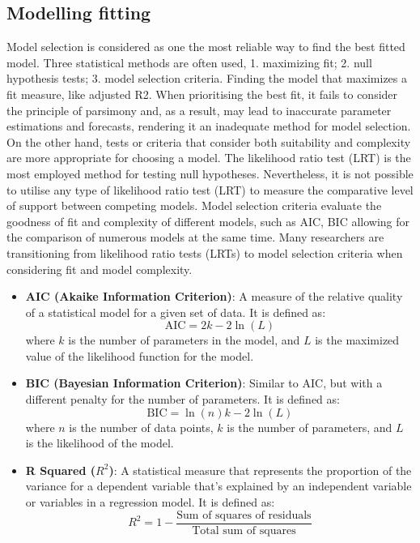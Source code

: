 \documentclass{article}
\begin{document}
\subsection{Modelling fitting}
Model selection is considered as one the most reliable way to find the best fitted model. 
Three statistical methods are often used, 1. maximizing fit; 2. null hypothesis tests; 3. model selection criteria\cite{johnson2004}.  Finding the model that maximizes a fit measure, like adjusted R2. 
When prioritising the best fit, it fails to consider the principle of parsimony and, as a result, may lead to inaccurate parameter estimations and forecasts, rendering it an inadequate method for model selection. On the other hand, tests or criteria that consider both suitability and complexity are more appropriate for choosing a model.
The likelihood ratio test (LRT) is the most employed method for testing null hypotheses. Nevertheless, it is not possible to utilise any type of likelihood ratio test (LRT) to measure the comparative level of support between competing models.
Model selection criteria evaluate the goodness of fit and complexity of different models, such as AIC, BIC allowing for the comparison of numerous models at the same time. 
Many researchers are transitioning from likelihood ratio tests (LRTs) to model selection criteria when considering fit and model complexity\cite{posada2003}. 
\begin{itemize}
    \item \textbf{AIC (Akaike Information Criterion)}: 
    A measure of the relative quality of a statistical model for a given set of data. It is defined as:
    \begin{equation}
        \text{AIC} = 2k - 2\ln(L)
    \end{equation}
    where $k$ is the number of parameters in the model, and $L$ is the maximized value of the likelihood function for the model.
    
    \item \textbf{BIC (Bayesian Information Criterion)}: 
    Similar to AIC, but with a different penalty for the number of parameters. It is defined as:
    \begin{equation}
        \text{BIC} = \ln(n)k - 2\ln(L)
    \end{equation}
    where $n$ is the number of data points, $k$ is the number of parameters, and $L$ is the likelihood of the model.
    
    \item \textbf{R Squared ($R^2$)}: 
    A statistical measure that represents the proportion of the variance for a dependent variable that's explained by an independent variable or variables in a regression model. It is defined as:
    \begin{equation}
        R^2 = 1 - \frac{\text{Sum of squares of residuals}}{\text{Total sum of squares}}
    \end{equation}
\end{itemize}
\end{document}
